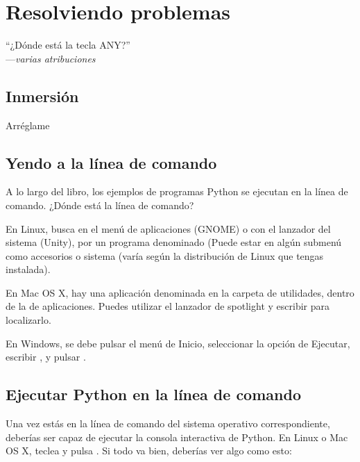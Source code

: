 
\chapter{Resolviendo problemas}

\begin{citaCap}
    ``¿Dónde está la tecla ANY?'' \\
        ---\emph{varias atribuciones}
\end{citaCap}

\section{Inmersión}

Arréglame

\section{Yendo a la línea de comando}

A lo largo del libro, los ejemplos de programas Python se ejecutan en la línea de comando. ¿Dónde está la línea de comando?

En Linux, busca en el menú de aplicaciones (GNOME) o con el lanzador del sistema (Unity), por un programa denominado  (Puede estar en algún submenú como accesorios o sistema (varía según la distribución de Linux que tengas instalada).

En Mac OS X, hay una aplicación denominada  en la carpeta de utilidades, dentro de la de aplicaciones. Puedes utilizar el lanzador de spotlight y escribir  para localizarlo.

En Windows, se debe pulsar el menú de Inicio, seleccionar la opción de Ejecutar, escribir , y pulsar .

\section{Ejecutar Python en la línea de comando}

Una vez estás en la línea de comando del sistema operativo correspondiente, deberías ser capaz de ejecutar la consola interactiva de Python. En Linux o Mac OS X, teclea  y pulsa . Si todo va bien, deberías ver algo como esto:

